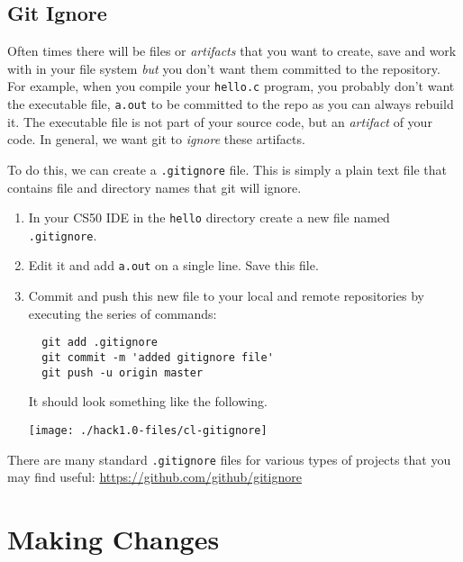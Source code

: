 \documentclass[12pt]{scrartcl}
\begin{document}
\subsection{Git Ignore}

Often times there will be files or \emph{artifacts} that you want 
to create, save and work with in your file system \emph{but} you 
don't want them committed to the repository.  For example, when
you compile your \texttt{hello.c} program, you probably
don't want the executable file, \texttt{a.out} to be
committed to the repo as you can always rebuild it.  The executable
file is not part of your source code, but an \emph{artifact} of your 
code.  In general, we want git to \emph{ignore} these artifacts.

To do this, we can create a \texttt{.gitignore} file.  This
is simply a plain text file that contains file and directory names 
that git will ignore.  

\begin{enumerate}
  \item In your CS50 IDE in the \texttt{hello} directory
  create a new file named \texttt{.gitignore}.  

  \item Edit it and add \texttt{a.out} on a single line.
  Save this file.
  
  \item Commit and push this new file to your local and remote
  repositories by executing the series of commands:
  
  \begin{verbatim}
  git add .gitignore
  git commit -m 'added gitignore file'
  git push -u origin master
  \end{verbatim}
  
  It should look something like the following.
  
  \begin{center}
  \texttt{[image: ./hack1.0-files/cl-gitignore]}
  \end{center}
  
\end{enumerate}

There are many standard \texttt{.gitignore} files for
various types of projects that you may find useful: 
\url{https://github.com/github/gitignore}

\section{Making Changes}
\end{document}
